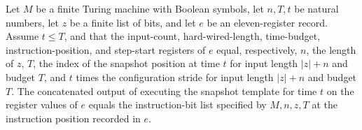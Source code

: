\begin{theorem}
\label{Complexity.UTab.snap_bits}
\leanok
{}
Let $M$ be a finite Turing machine with Boolean symbols, let $n,T,t$ be natural numbers,
let $z$ be a finite list of bits, and let $e$ be an eleven-register record. Assume $t\le
T$, and that the input-count, hard-wired-length, time-budget, instruction-position, and
step-start registers of $e$ equal, respectively, $n$, the length of $z$, $T$, the index
of the snapshot position at time $t$ for input length $|z|+n$ and budget $T$, and $t$
times the configuration stride for input length $|z|+n$ and budget $T$. The concatenated
output of executing the snapshot template for time $t$ on the register values of $e$
equals the instruction-bit list specified by $M,n,z,T$ at the instruction position
recorded in $e$.
\end{theorem}
